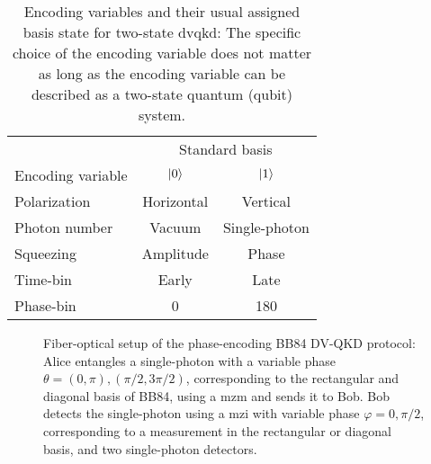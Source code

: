 \cite{Bennett1984} %
\cite{Shor2000} %
\cite{Bennett1992} %
\begin{table}[htb]
	\centering	
	\begin{tabular}{lcc}
		\toprule
		& \multicolumn{2}{c}{Standard basis} \\
		\cmidrule{2-3}
		Encoding variable & $\ket{0}$ & $\ket{1}$ \\
		\midrule
		Polarization & Horizontal & Vertical \\
		Photon number & Vacuum & Single-photon \\
		Squeezing & Amplitude & Phase \\
		Time-bin & Early & Late \\
		Phase-bin & \SI{0}{\deg} & \SI{180}{\deg} \\
		\bottomrule
	\end{tabular}
	\caption{Encoding variables and their usual assigned basis state for two-state \gls{dvqkd}: The specific choice of the encoding variable does not matter as long as the encoding variable can be described as a two-state quantum (qubit) system.}
\end{table}
\begin{figure}[htb]
	\centering
	
	\caption{Fiber-optical setup of the phase-encoding BB84 DV-QKD protocol: Alice entangles a single-photon with a variable phase $\theta=(0,\pi),(\pi/2,3\pi/2)$, corresponding to the rectangular and diagonal basis of BB84, using a \gls{mzm} and sends it to Bob. Bob detects the single-photon using a \gls{mzi} with variable phase $\varphi=0,\pi/2$, corresponding to a measurement in the rectangular or diagonal basis, and two single-photon detectors.}
\end{figure}
